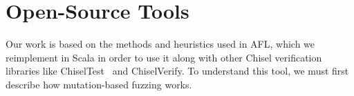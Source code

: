 \documentclass[conference]{IEEEtran}
\begin{document}
%
%



\section{Open-Source Tools}
\label{sec:tools}

Our work is based on the methods and heuristics used in AFL, which we reimplement in Scala in order to use it along with other Chisel verification libraries like ChiselTest~\cite{chisel:tester2} and ChiselVerify.
To understand this tool, we must first describe how mutation-based fuzzing works.
\end{document}
